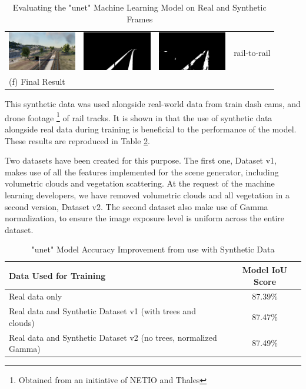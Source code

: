 \begin{table}
\begin{tabular}{cccc}
  \includegraphics[width=30mm]{src/img/results-ml-0/par5/frame.jpg} & 
  \includegraphics[width=30mm]{src/img/results-ml-0/par5/seg.jpg} & 
  \includegraphics[width=30mm]{src/img/results-ml-0/par5/det.jpeg} &
  rail-to-rail  \\
  \multicolumn{4}{l}{  (f) Final Result  } \\
  
\end{tabular}
\caption{Evaluating the "unet" Machine Learning Model\cite{ALEXPETRE} on Real and Synthetic Frames}
\label{fig:ml-pics}
\end{table}

This synthetic data was used alongside real-world data from train dash cams\cite{zendel2019railsem19}, and drone footage \footnote{Obtained from an initiative of NETIO and Thales} of rail tracks. It is shown in \cite{ALEXPETRE} that the use of synthetic data alongside real data during training is beneficial to the performance of the model. These results are reproduced in Table \ref{fig:accuracy-improve}.

Two datasets have been created for this purpose. The first one, Dataset v1, makes use of all the features implemented for the scene generator, including volumetric clouds and vegetation scattering. At the request of the machine learning developers, we have removed volumetric clouds and all vegetation in a second version, Dataset v2. The second dataset also make use of Gamma normalization, to ensure the image exposure level is uniform across the entire dataset.

\begin{table}
\begin{tabular}{|l|c|}
\hline
  Data Used for Training & Model IoU Score \\ \hline
  Real data only & 87.39\%  \\
  Real data and Synthetic Dataset v1 (with trees and clouds) & 87.47\%  \\ 
  Real data and Synthetic Dataset v2 (no trees, normalized Gamma) & 87.49\%  \\
\hline
\end{tabular}
\caption{"unet" Model Accuracy Improvement from use with Synthetic Data\cite{ALEXPETRE}}
\label{fig:accuracy-improve}
\end{table}


